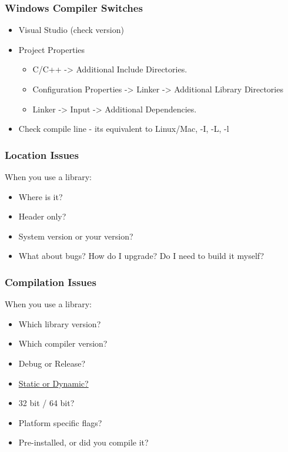 \subsubsection{Windows Compiler
Switches}\label{windows-compiler-switches}

\begin{itemize}
\itemsep1pt\parskip0pt
\item
  Visual Studio (check version)
\item
  Project Properties

  \begin{itemize}
  \itemsep1pt\parskip0pt
  \item
    C/C++ -\textgreater{} Additional Include Directories.
  \item
    Configuration Properties -\textgreater{} Linker -\textgreater{}
    Additional Library Directories
  \item
    Linker -\textgreater{} Input -\textgreater{} Additional
    Dependencies.
  \end{itemize}
\item
  Check compile line - its equivalent to Linux/Mac, -I, -L, -l
\end{itemize}

\subsubsection{Location Issues}\label{location-issues}

When you use a library:

\begin{itemize}
\itemsep1pt\parskip0pt
\item
  Where is it?
\item
  Header only?
\item
  System version or your version?
\item
  What about bugs? How do I upgrade? Do I need to build it myself?
\end{itemize}

\subsubsection{Compilation Issues}\label{compilation-issues}

When you use a library:

\begin{itemize}
\itemsep1pt\parskip0pt
\item
  Which library version?
\item
  Which compiler version?
\item
  Debug or Release?
\item
  \href{http://www.learncpp.com/cpp-tutorial/a1-static-and-dynamic-libraries/}{Static
  or Dynamic?}
\item
  32 bit / 64 bit?
\item
  Platform specific flags?
\item
  Pre-installed, or did you compile it?
\end{itemize}

